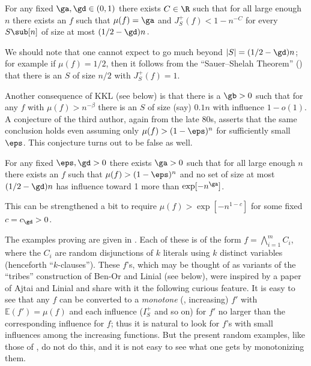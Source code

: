 %
\begin{thm}\label{prop1}
For any fixed $\ga,\gd \in (0,1)$
%
there exists $C\in\R$ such that for
all   %
large enough $n$
%
there exists 
%
%
%
%
an    %
$f$ such that  
$\mu(f) =\ga$ and $J_S^+(f)<1-n^{-C}$
for every $S\sub [n]$ of size %
%
at most $(1/2-\gd)n\,.$ 
%
%
\end{thm}

\nin
We should note that one cannot expect to go much
beyond $|S|=(1/2-\gd)n$; for example if $\mu(f)  =1/2$,
then it follows from the ``Sauer--Shelah Theorem''
() that there is
an $S$ of size $n/2$ with
$J_S^+(f) = 1$.

Another consequence of KKL (see  below)
is that there is a $\gb>0$ such that for any $f$ with $\mu(f) > n^{-\beta}$
there is an $S$ of size (say) $0.1 n$ with influence $1-o(1)$.
A conjecture of the third author, again from
the late 80s, asserts
that the same conclusion holds even assuming only
$\mu(f) > (1-\eps)^n$
for sufficiently small $\eps$.
This conjecture turns out to be false as well.  %


%
\begin{thm}\label{prop2}
For any fixed $\eps, \gd>0$
%
there exists $\ga > 0$ such that for all large enough $n$
%
there exists an $f$ %
%
such that
$\mu(f) > (1-\eps)^n$ and no set of %
%
size at most $(1/2-\gd)n$   %
%
has influence
%
toward   %
1 more than $\exp[-n^\ga]$.
\end{thm}


\mn
This can be strengthened a bit to require
$\mu(f)  > \exp[-n^{1-c}]$ for some fixed $c=c_\gd>0$.





The examples proving   
are given in .
Each of these is of the form %
$f= \bigwedge_{i=1}^m C_i$,  %
where the %
$C_i$  %
are random %
disjunctions %
of $k$ literals
using $k$ distinct variables (henceforth ``$k$-clauses'').
These $f$'s, %
%
which may be thought of as
variants of the ``tribes''
construction of Ben-Or and Linial
(see below),
were inspired by a paper of
Ajtai and Linial \cite {AL} and share with it the following
curious feature.
%
It is  %
easy to see that any $f$ can be converted to a
\emph{monotone}
(\ie, increasing) $f'$ with $\mathbb E (f')=\mu(f) $ and each
influence ($I_S^+$ and so on) for $f'$ no larger than
the corresponding influence for $f$;
thus %
it is  %
natural to look for $f$'s %
%
with small influences
among the increasing functions.
But the present random examples, like those of \cite{AL},
do not do this, and %
it is %
not easy to see what one gets by monotonizing them.

